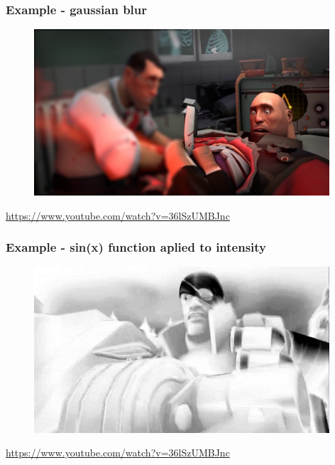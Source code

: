 \begin{frame}
\frametitle{Example - gaussian blur}
  \begin{figure}[h]
  \includegraphics[width=11cm,keepaspectratio]{pics/gauss.png}
  \end{figure}
  \url{https://www.youtube.com/watch?v=36lSzUMBJnc}
\end{frame}

\begin{frame}
  \frametitle{Example - sin(x) function aplied to intensity}
  \begin{figure}[h]
  \includegraphics[width=11cm,keepaspectratio]{pics/sin.png}
  \end{figure}
  \url{https://www.youtube.com/watch?v=36lSzUMBJnc}
\end{frame}

